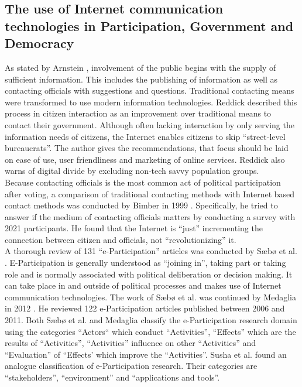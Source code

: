 \subsection{The use of Internet communication technologies in Participation, Government and Democracy}
As stated by Arnstein \cite{Arnstein1969_citizen_participation}, involvement of the public begins with the supply of sufficient information. This includes the publishing of information as well as contacting officials with suggestions and questions. Traditional contacting means were transformed to use modern information technologies. Reddick \cite{Reddick2005_Citizen_interaction_with_egovernment} described this process in citizen interaction as an improvement over traditional means to contact their government. Although often lacking interaction by only serving the information needs of citizens, the Internet enables citizens to skip ``street-level bureaucrats''. The author gives the recommendations, that focus should be laid on ease of use, user friendliness and marketing of online services. Reddick also warns of digital divide by excluding non-tech savvy population groups.\\
Because contacting officials is the most common act of political participation after voting, a comparison of traditional contacting methods with Internet based contact methods was conducted by Bimber in 1999 \cite{Bimber1999_Citizen_communication_with_government}. Specifically, he tried to answer if the medium of contacting officials matters by conducting a survey with 2021 participants. He found that the Internet is ``just'' incrementing the connection between citizen and officials, not ``revolutionizing'' it.\\
A thorough review of 131 ``e-Participation'' articles was conducted by S{\ae}b{\o} et al. \cite{Saebo_eParticipation}. E-Participation is generally understood as ``joining in'', taking part or taking role and is normally associated with political deliberation or decision making. It can take place in and outside of political processes and makes use of Internet communication technologies. The work of S{\ae}b{\o} et al. was continued by Medaglia in 2012 \cite{Medaglia2012_eParticipation}. He reviewed 122 e-Participation articles published between 2006 and 2011. Both S{\ae}b{\o} et al. and Medaglia classify the e-Participation research domain using the categories ``Actors`` which conduct ``Activities'', ``Effects'' which are the results of ``Activities'', ``Activities'' influence on other ``Activities'' and ``Evaluation'' of ``Effects' which improve the ``Activities''. Susha et al. \cite{Susha2012_eParticipation} found an analogue classification of e-Participation research. Their categories are ``stakeholders'', ``environment'' and ``applications and tools''.\\
